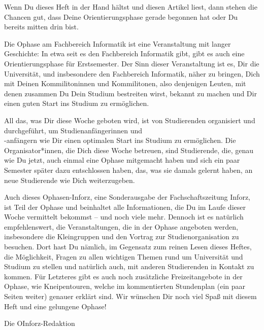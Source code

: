 {Wenn Du dieses Heft in der Hand hältst und diesen Artikel liest, dann stehen die Chancen gut, dass Deine Orientierungsphase gerade begonnen hat oder Du bereits mitten drin bist.}
{
Die Ophase am Fachbereich Informatik ist eine Veranstaltung mit langer Geschichte: In etwa seit es den Fachbereich Informatik gibt, gibt es auch eine Orientierungsphase für Erstsemester. Der Sinn dieser Veranstaltung ist es, Dir die Universität, und insbesondere den Fachbereich Informatik, näher zu bringen, Dich mit Deinen Kommilitoninnen und Kommilitonen, also denjenigen Leuten, mit denen zusammen Du Dein Studium bestreiten wirst, bekannt zu machen und Dir einen guten Start ins Studium zu ermöglichen.

All das, was Dir diese Woche geboten wird, ist von Studierenden organisiert und durchgeführt, um Studienanfängerinnen und \\ -anfängern wie Dir einen optimalen Start ins Studium zu ermöglichen. Die Organisator*innen, die Dich diese Woche betreuen, sind Studierende, die, genau wie Du jetzt, auch einmal eine Ophase mitgemacht haben und sich ein paar Semester später dazu entschlossen haben, das, was sie damals gelernt haben, an neue Studierende wie Dich weiterzugeben.

Auch dieses Ophasen-Inforz, eine Sonderausgabe der Fachschaftszeitung Inforz, ist Teil der Ophase und beinhaltet alle Informationen, die Du im Laufe dieser Woche vermittelt bekommst – und noch viele mehr. Dennoch ist es natürlich empfehlenswert, die Veranstaltungen, die in der Ophase angeboten werden, insbesondere die Kleingruppen und den Vortrag zur Studienorganisation zu besuchen. Dort hast Du nämlich, im Gegensatz zum reinen Lesen dieses Heftes, die Möglichkeit, Fragen zu allen wichtigen Themen rund um Universität und Studium zu stellen und natürlich auch, mit anderen Studierenden in Kontakt zu kommen. Für Letzteres gibt es auch noch zusätzliche Freizeitangebote in der Ophase, wie Kneipentouren, welche im kommentierten Stundenplan (ein paar Seiten weiter) genauer erklärt sind.
Wir wünschen Dir noch viel Spaß mit diesem Heft und eine gelungene Ophase!
}
{Die OInforz-Redaktion}